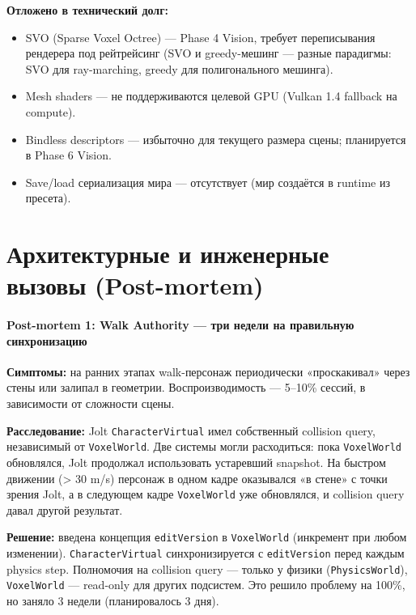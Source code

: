 \textbf{Отложено в технический долг:}

\begin{itemize}
\tightlist
\item
  SVO (Sparse Voxel Octree) --- Phase 4 Vision, требует переписывания рендерера под рейтрейсинг (SVO и greedy-мешинг --- разные парадигмы: SVO для ray-marching, greedy для полигонального мешинга).
\item
  Mesh shaders --- не поддерживаются целевой GPU (Vulkan 1.4 fallback на compute).
\item
  Bindless descriptors --- избыточно для текущего размера сцены; планируется в Phase 6 Vision.
\item
  Save/load сериализация мира --- отсутствует (мир создаётся в runtime из пресета).
\end{itemize}

\section{Архитектурные и инженерные вызовы (Post-mortem)}\label{KT-3.2_Final_Report-ux430ux440ux445ux438ux442ux435ux43aux442ux443ux440ux43dux44bux435-ux438-ux438ux43dux436ux435ux43dux435ux440ux43dux44bux435-ux432ux44bux437ux43eux432ux44b-post-mortem}

\paragraph{Post-mortem 1: Walk Authority --- три недели на правильную синхронизацию}\label{KT-3.2_Final_Report-post-mortem-1-walk-authority--ux442ux440ux438-ux43dux435ux434ux435ux43bux438-ux43dux430-ux43fux440ux430ux432ux438ux43bux44cux43dux443ux44e-ux441ux438ux43dux445ux440ux43eux43dux438ux437ux430ux446ux438ux44e}

\textbf{Симптомы:} на ранних этапах walk-персонаж периодически «проскакивал» через стены или залипал в геометрии. Воспроизводимость --- 5--10\% сессий, в зависимости от сложности сцены.

\textbf{Расследование:} Jolt \texttt{CharacterVirtual} имел собственный collision query, независимый от \texttt{VoxelWorld}. Две системы могли расходиться: пока \texttt{VoxelWorld} обновлялся, Jolt продолжал использовать устаревший snapshot. На быстром движении (\textgreater{} 30 m/s) персонаж в одном кадре оказывался «в стене» с точки зрения Jolt, а в следующем кадре \texttt{VoxelWorld} уже обновлялся, и collision query давал другой результат.

\textbf{Решение:} введена концепция \texttt{editVersion} в \texttt{VoxelWorld} (инкремент при любом изменении). \texttt{CharacterVirtual} синхронизируется с \texttt{editVersion} перед каждым physics step. Полномочия на collision query --- только у физики (\texttt{PhysicsWorld}), \texttt{VoxelWorld} --- read-only для других подсистем. Это решило проблему на 100\%, но заняло 3 недели (планировалось 3 дня).

